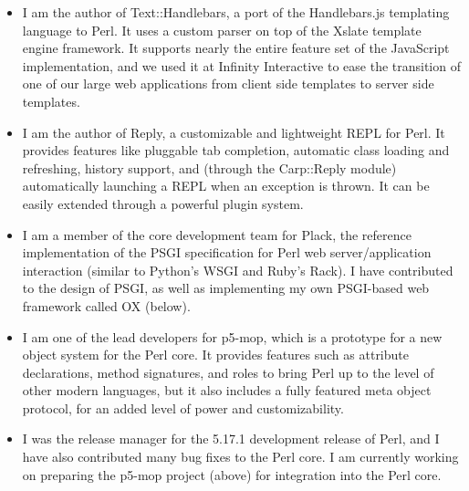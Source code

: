\documentclass[letterpaper]{article}
\begin{document}
\begin{itemize}
    \item {} \vspace{6pt} \linebreak
        I am the author of Text::Handlebars, a port of the Handlebars.js
        templating language to Perl. It uses a custom parser on top of the
        Xslate template engine framework. It supports nearly the entire feature
        set of the JavaScript implementation, and we used it at Infinity
        Interactive to ease the transition of one of our large web applications
        from client side templates to server side templates.
    \item {} \vspace{6pt} \linebreak
        I am the author of Reply, a customizable and lightweight REPL for Perl.
        It provides features like pluggable tab completion, automatic class
        loading and refreshing, history support, and (through the Carp::Reply
        module) automatically launching a REPL when an exception is thrown. It
        can be easily extended through a powerful plugin system.
    \item {} \vspace{6pt} \linebreak
        I am a member of the core development team for Plack, the reference
        implementation of the PSGI specification for Perl web
        server/application interaction (similar to Python's WSGI and Ruby's
        Rack). I have contributed to the design of PSGI, as well as
        implementing my own PSGI-based web framework called OX (below).
    \item {} \vspace{6pt} \linebreak
        I am one of the lead developers for p5-mop, which is a prototype for a
        new object system for the Perl core. It provides features such as
        attribute declarations, method signatures, and roles to bring Perl up
        to the level of other modern languages, but it also includes a fully
        featured meta object protocol, for an added level of power and
        customizability.
    \item {} \vspace{6pt} \linebreak
        I was the release manager for the 5.17.1 development release of Perl,
        and I have also contributed many bug fixes to the Perl core. I am
        currently working on preparing the p5-mop project (above) for
        integration into the Perl core.
\end{itemize}
\end{document}
